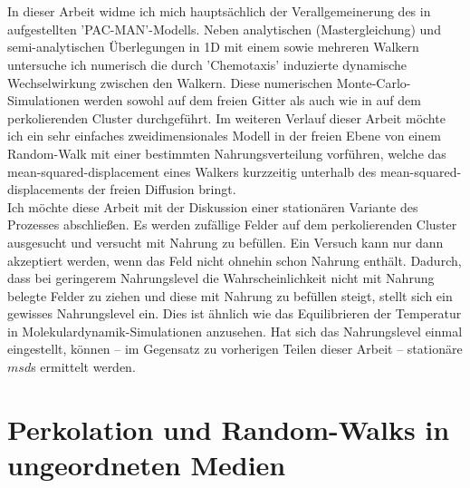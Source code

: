 \documentclass[a4paper, 12pt]{report}
\begin{document}
\\
\\
\noindent In dieser Arbeit widme ich mich hauptsächlich der Verallgemeinerung des in \cite{doi:10.1063/1.4999485} aufgestellten 'PAC-MAN'-Modells. Neben analytischen (Mastergleichung) und semi-analytischen Überlegungen in 1D mit einem sowie mehreren Walkern untersuche ich numerisch die durch 'Chemotaxis' induzierte dynamische Wechselwirkung zwischen den Walkern. Diese numerischen Monte-Carlo-Simulationen werden sowohl auf dem freien Gitter als auch wie in \cite{doi:10.1063/1.4999485} auf dem perkolierenden Cluster durchgeführt. Im weiteren Verlauf dieser Arbeit möchte ich ein sehr einfaches zweidimensionales Modell in der freien Ebene von einem Random-Walk mit einer bestimmten Nahrungsverteilung vorführen, welche das mean-squared-displacement eines Walkers kurzzeitig unterhalb des mean-squared-displacements der freien Diffusion bringt.
\\
Ich möchte diese Arbeit mit der Diskussion einer stationären Variante des Prozesses abschließen. Es werden zufällige Felder auf dem perkolierenden Cluster ausgesucht und versucht mit Nahrung zu befüllen. Ein Versuch kann nur dann akzeptiert werden, wenn das Feld nicht ohnehin schon Nahrung enthält. Dadurch, dass bei geringerem Nahrungslevel die Wahrscheinlichkeit nicht mit Nahrung belegte Felder zu ziehen und diese mit Nahrung zu befüllen steigt, stellt sich ein gewisses Nahrungslevel ein. Dies ist ähnlich wie das Equilibrieren der Temperatur in Molekulardynamik-Simulationen anzusehen. Hat sich das Nahrungslevel einmal eingestellt, können -- im Gegensatz zu vorherigen Teilen dieser Arbeit -- stationäre $msd$s ermittelt werden.


\chapter{Perkolation und Random-Walks in ungeordneten Medien}
\end{document}
